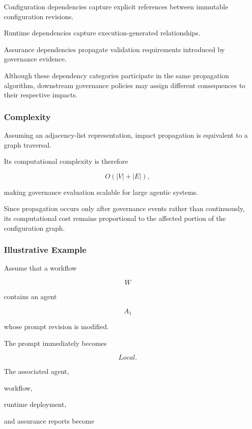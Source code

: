 \documentclass[10pt]{article}
\begin{document}
Configuration dependencies capture explicit references between immutable
configuration revisions.

Runtime dependencies capture execution-generated relationships.

Assurance dependencies propagate validation requirements introduced by
governance evidence.

Although these dependency categories participate in the same propagation
algorithm, downstream governance policies may assign different consequences to
their respective impacts.

\subsubsection{Complexity}

Assuming an adjacency-list representation, impact propagation is equivalent to
a graph traversal.

Its computational complexity is therefore

\begin{equation}
O(|V|+|E|),
\label{eq:complexity}
\end{equation}

making governance evaluation scalable for large agentic systems.

Since propagation occurs only after governance events rather than continuously,
its computational cost remains proportional to the affected portion of the
configuration graph.

\subsubsection{Illustrative Example}

Assume that a workflow

\[
W
\]

contains an agent

\[
A_1
\]

whose prompt revision is modified.

The prompt immediately becomes

\[
Local.
\]

The associated agent,

workflow,

runtime deployment,

and assurance reports become
\end{document}
